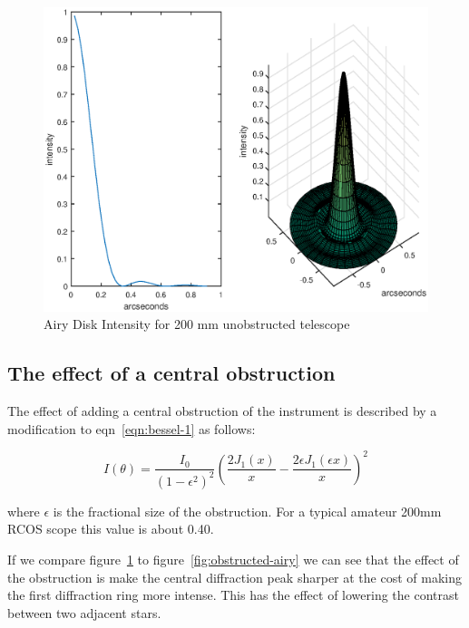 \documentclass[11pt]{article}
\begin{document}
\begin{figure}[htb]
	\begin{center}
		\includegraphics[scale=0.8]{./images/airy_bessel.eps}
		\caption{Airy Disk Intensity for 200 mm unobstructed telescope}
		\label{fig:airyplots}
	\end{center}
\end{figure}
\newpage

\subsection{The effect of a central obstruction}

The effect of adding a central obstruction of the instrument is described by a modification to eqn~\ref{eqn:bessel-1} as follows:

\begin{equation}
I(\theta) =  \frac{I_{0}}{\left( 1-\epsilon^2 \right) ^2}     
\left(
\frac{2J_{1}(x)}{x} - \frac{2\epsilon J_{1}(\epsilon x)}{x}
\right)^{2}
\end{equation}

where $\epsilon$ is the fractional size of the obstruction.  For a typical amateur 200mm RCOS scope this value is about 0.40.  

If we compare figure~\ref{fig:airyplots} to figure~\ref{fig:obstructed-airy} we can see that the effect of the obstruction is make the central diffraction peak sharper at the cost of making the first diffraction ring more intense.  This has the effect of lowering the contrast between two adjacent stars.  
\end{document}
